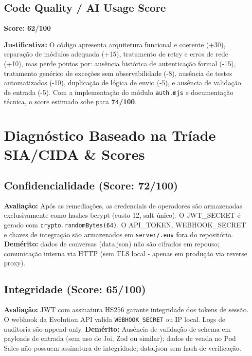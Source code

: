 \documentclass[11pt, a4paper]{article}
\begin{document}
\subsection{Code Quality / AI Usage Score}

\begin{center}
  \large\textbf{Score: 62/100}
\end{center}

\textbf{Justificativa:} O código apresenta arquitetura funcional e coerente (+30), separação de módulos adequada (+15), tratamento de retry e erros de rede (+10), mas perde pontos por: ausência histórica de autenticação formal (-15), tratamento genérico de exceções sem observabilidade (-8), ausência de testes automatizados (-10), duplicação de lógica de envio (-5), e ausência de validação de entrada (-5). Com a implementação do módulo \texttt{auth.mjs} e documentação técnica, o score estimado sobe para \textbf{74/100}.

\section{Diagnóstico Baseado na Tríade SIA/CIDA \& Scores}

\subsection{Confidencialidade (Score: 72/100)}

\textbf{Avaliação:} Após as remediações, as credenciais de operadores são armazenadas exclusivamente como hashes bcrypt (custo 12, salt único). O JWT\_SECRET é gerado com \texttt{crypto.randomBytes(64)}. O API\_TOKEN, WEBHOOK\_SECRET e chaves de integração são armazenados em \texttt{server/.env} fora do repositório. \textbf{Demérito:} dados de conversas (data.json) não são cifrados em repouso; comunicação interna via HTTP (sem TLS local - apenas em produção via reverse proxy).

\subsection{Integridade (Score: 65/100)}

\textbf{Avaliação:} JWT com assinatura HS256 garante integridade dos tokens de sessão. O webhook da Evolution API valida \texttt{WEBHOOK\_SECRET} ou IP local. Logs de auditoria são append-only. \textbf{Demérito:} Ausência de validação de schema em payloads de entrada (sem uso de Joi, Zod ou similar); dados de venda no Pod Sales não possuem assinatura de integridade; data.json sem hash de verificação.
\end{document}
